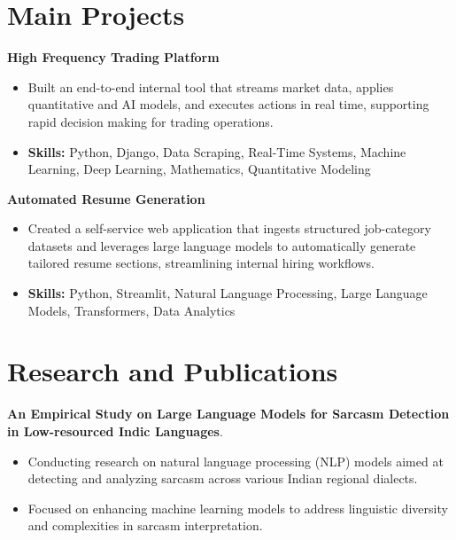 \documentclass[a4paper,11pt]{article}
\begin{document}
\section{\textbf{Main Projects}}

\vspace{1mm}
  \textbf{High Frequency Trading Platform  }
\vspace{-1.5mm} %
\begin{itemize}
  \item Built an end-to-end internal tool that streams market data, applies quantitative and AI models, and executes actions in real time, supporting rapid decision making for trading operations.
\vspace{-3mm}
  \item \textbf{Skills:} Python, Django, Data Scraping, Real-Time Systems, Machine Learning, Deep Learning, Mathematics, Quantitative Modeling
\end{itemize}


\vspace{1mm}
   \textbf{Automated Resume Generation }
\vspace{-1.5mm} %
\begin{itemize}
  \item Created a self-service web application that ingests structured job-category datasets and leverages large language models to automatically generate tailored resume sections, streamlining internal hiring workflows.
\vspace{-3mm}
  \item \textbf{Skills:} Python, Streamlit, Natural Language Processing, Large Language Models, Transformers, Data Analytics
\end{itemize}



\section{\textbf{Research and Publications} \hfill }
\vspace{1mm}
  \textbf{An Empirical Study on Large Language Models for Sarcasm Detection in Low-resourced Indic Languages}.
\vspace{-1mm} %
\begin{itemize}
  \item Conducting research on natural language processing (NLP) models aimed at detecting and analyzing sarcasm across various Indian regional dialects.
\vspace{-3mm}
  \item Focused on enhancing machine learning models to address linguistic diversity and complexities in sarcasm interpretation.
\end{itemize}
\end{document}

